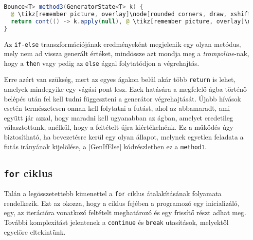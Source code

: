 \begin{center}
\begin{mdframed}
\begin{minipage}[t]{0.6\textwidth}
\begin{lstlisting}[language=Java, numbers=none, breaklines=true]
Bounce<T> method3(GeneratorState<T> k) {
  @ \tikz[remember picture, overlay]\node[rounded corners, draw, xshift=-0.1cm, inner sep=5pt, anchor=west] {Kódrészlet \#2}; \vspace*{0.3cm} @
  return cont(() -> k.apply(null), @ \tikz[remember picture, overlay]\node[rounded corners, draw, xshift=-0.2cm, inner sep=5pt, anchor=west, yshift=0.1cm] {Kifejezés \#2}; \vspace*{0.2cm} \hspace*{1.6cm} @);
}
\end{lstlisting} 
\end{minipage}
\end{mdframed}
\label{GenIfElse}
\end{center}

Az \texttt{if-else} transzformációjának eredményeként megjelenik egy olyan metódus, mely nem ad vissza generált értéket, mindössze azt mondja meg a \textit{trampoline}-nak, hogy a \texttt{then} vagy pedig az \texttt{else} ággal folytatódjon a végrehajtás.

Erre azért van szükség, mert az egyes ágakon belül akár több \texttt{return} is lehet, amelyek mindegyike egy vágási pont lesz. Ezek hatására a megfelelő ágba történő belépés után fel kell tudni függeszteni a generátor végrehajtását. Újabb hívások esetén természetesen onnan kell folytatni a futást, ahol az abbamaradt, ami együtt jár azzal, hogy maradni kell ugyanabban az ágban, amelyet eredetileg választottunk, anélkül, hogy a feltételt újra kiértékelnénk. Ez a működés úgy biztosítható, ha bevezetésre kerül egy olyan állapot, melynek egyetlen feladata a futás irányának kijelölése, a \ref{GenIfElse} kódrészletben ez a \texttt{method1}.

\pagebreak

\subsection{\texttt{for} ciklus}

Talán a legösszetettebb kimenettel a \texttt{for} ciklus átalakításának folyamata rendelkezik. Ezt az okozza, hogy a ciklus fejében a programozó egy inicializáló, egy, az iterációra vonatkozó feltételt meghatározó és egy frissítő részt adhat meg. További komplexitást jelentenek a \texttt{continue} és \texttt{break} utasítások, melyektől egyelőre eltekintünk.


